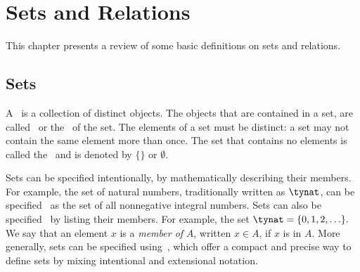 \chapter{Sets and Relations}
\label{ch:bg::sets-and-relations}

\begin{cluster}
\label{grp:prmbl:bg::sets-and-relations::presents}

\begin{preamble}
\label{prmbl:bg::sets-and-relations::presents}
This chapter presents a review of some basic definitions on sets and
relations.

\end{preamble}
\end{cluster}


\section{Sets}
\label{sec:bg::sets}

\begin{cluster}
\label{grp:grm:bg::sets-and-relations::collection}

\begin{gram}
\label{grm:bg::sets-and-relations::collection}
A~ is a collection of distinct objects.  The objects that
are contained in a set, are called~ or
the~ of the set.  The elements of a set must be
distinct: a set may not contain the same element more than once. The
set that contains no elements is called the~ and is
denoted by $\{\}$ or $\emptyset$.

\end{gram}
\end{cluster}

\begin{cluster}
\label{grp:grm:bg::sets-and-relations::specification-of-sets}

\begin{gram}
\label{grm:bg::sets-and-relations::specification-of-sets}
Sets can be specified intentionally, by mathematically describing
their members.
For example, the set of natural numbers, traditionally written as
$\tynat$, can be specified~ as the set of all
nonnegative integral numbers.
Sets can also be specified~ by listing their members.
For example, the set $\tynat = \{0, 1, 2, \ldots\}.$
We say that an element $x$ is a {\em member of} $A$, written $x \in
A$, if $x$ is in $A$.  
More generally, sets can be specified using~,
which offer a compact and precise way to define sets by mixing
intentional and extensional notation.

\end{gram}
\end{cluster}

